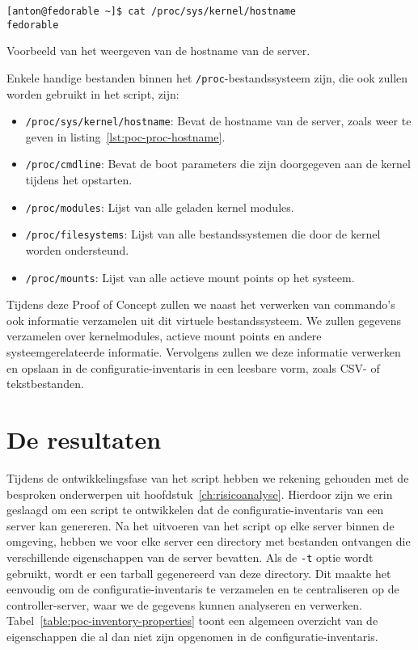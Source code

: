 \begin{listing}
  \begin{verbatim}
[anton@fedorable ~]$ cat /proc/sys/kernel/hostname
fedorable
  \end{verbatim}
  \caption[Weergave van server hostname.]{Voorbeeld van het weergeven van de hostname van de server.}
  \label{lst:poc-proc-hostname}
\end{listing}

Enkele handige bestanden binnen het \texttt{/proc}-bestandssysteem zijn, die ook zullen worden gebruikt in het script, zijn:

\begin{itemize}
    \item \texttt{/proc/sys/kernel/hostname}: Bevat de hostname van de server, zoals weer te geven in listing~\ref{lst:poc-proc-hostname}.
    \item \texttt{/proc/cmdline}: Bevat de boot parameters die zijn doorgegeven aan de kernel tijdens het opstarten.
    \item \texttt{/proc/modules}: Lijst van alle geladen kernel modules.
    \item \texttt{/proc/filesystems}: Lijst van alle bestandssystemen die door de kernel worden ondersteund.
    \item \texttt{/proc/mounts}: Lijst van alle actieve mount points op het systeem.
\end{itemize}

Tijdens deze Proof of Concept zullen we naast het verwerken van commando's ook informatie verzamelen uit dit virtuele bestandssysteem.
We zullen gegevens verzamelen over kernelmodules, actieve mount points en andere systeemgerelateerde informatie.
Vervolgens zullen we deze informatie verwerken en opslaan in de configuratie-inventaris in een leesbare vorm, zoals CSV- of tekstbestanden.

\section{De resultaten}
\label{poc_resultaten}

Tijdens de ontwikkelingsfase van het script hebben we rekening gehouden met de besproken onderwerpen uit hoofdstuk~\ref{ch:risicoanalyse}.
Hierdoor zijn we erin geslaagd om een script te ontwikkelen dat de configuratie-inventaris van een server kan genereren.
Na het uitvoeren van het script op elke server binnen de omgeving, hebben we voor elke server een directory met bestanden ontvangen die verschillende eigenschappen van de server bevatten.
Als de \texttt{-t} optie wordt gebruikt, wordt er een tarball gegenereerd van deze directory.
Dit maakte het eenvoudig om de configuratie-inventaris te verzamelen en te centraliseren op de controller-server, waar we de gegevens kunnen analyseren en verwerken.
Tabel~\ref{table:poc-inventory-properties} toont een algemeen overzicht van de eigenschappen die al dan niet zijn opgenomen in de configuratie-inventaris.

